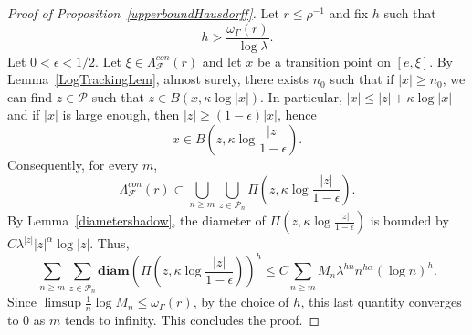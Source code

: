 \documentclass{amsart}
\theoremstyle{definition}
\theoremstyle{remark}
\begin{document}
 \begin{proof}[Proof of Proposition~\ref{upperboundHausdorff}]
Let $r\leq \rho^{-1}$ and fix $h$ such that
 $$h>\frac{\omega_\Gamma(r)}{-\log \lambda}.$$
 Let $0<\epsilon<1/2$.
 Let $\xi\in \Lambda^{con}_{\mathcal{F}}(r)$ and let $x$ be a transition point on $[e,\xi]$.
 By Lemma~\ref{LogTrackingLem}, almost surely, there exists $n_0$ such that if $|x|\geq n_0$, we can find $z\in \mathcal{P}$ such that $z\in B(x,\kappa \log |x|)$.
 In particular, $|x|\leq |z|+\kappa \log |x|$ and if $|x|$ is large enough, then $|z|\geq (1-\epsilon)|x|$, hence
 $$x\in B\left (z,\kappa \log \frac{|z|}{1-\epsilon}\right ).$$
 Consequently, for every $m$,
 $$\Lambda^{con}_{\mathcal{F}}(r)\subset \bigcup_{n\geq m}\bigcup_{z\in \mathcal{P}_n}\Pi\left (z,\kappa \log \frac{|z|}{1-\epsilon}\right ).$$
By Lemma~\ref{diametershadow}, the diameter of $\Pi\left (z,\kappa \log \frac{|z|}{1-\epsilon}\right )$ is bounded by $C\lambda^{|z|}|z|^\alpha \log |z|$.
Thus,
$$\sum_{n\geq m}\sum_{z\in \mathcal{P}_n}\mathbf{diam}\left (\Pi\left (z,\kappa \log \frac{|z|}{1-\epsilon}\right )\right )^h\leq C \sum_{n\geq m}M_n\lambda^{hn}n^{h\alpha} (\log n)^h.$$
Since $\limsup \frac{1}{n}\log M_n\leq \omega_{\Gamma}(r)$, by the choice of $h$, this last quantity converges to 0 as $m$ tends to infinity.
This concludes the proof.
 \end{proof}
\end{document}
